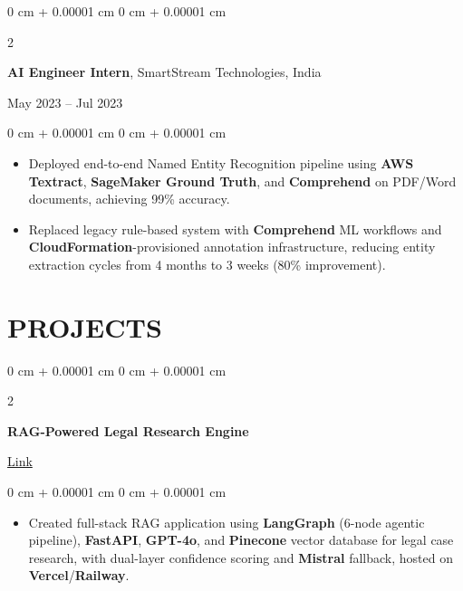 \documentclass[9pt, letterpaper]{extarticle}
\newenvironment{highlights}{
    \linespread{1.05}\selectfont
    \begin{itemize}[
        topsep=0.02 cm,
        parsep=0.02 cm,
        partopsep=0pt,
        itemsep=0.5pt,
        leftmargin=0.5em + 10pt
    ]
}{
    \end{itemize}
} %
\newenvironment{onecolentry}{
    \begin{adjustwidth}{
        0 cm + 0.00001 cm
    }{
        0 cm + 0.00001 cm
    }
}{
    \end{adjustwidth}
} %
\newenvironment{twocolentry}[2][]{
    \onecolentry
    \def\secondColumn{#2}
    \setcolumnwidth{\fill, 4.5 cm}
    \begin{paracol}{2}
}{
    \switchcolumn \raggedleft \secondColumn
    \end{paracol}
    \endonecolentry
} %
\let\hrefWithoutArrow\href
\begin{document}
        \vspace{0.13 cm}

        \begin{twocolentry}{
            May 2023 – Jul 2023
        }
            \textbf{AI Engineer Intern}, SmartStream Technologies, India
        \end{twocolentry}

        \vspace{0.04 cm}
        \begin{onecolentry}
            \begin{highlights}
                \item Deployed end-to-end Named Entity Recognition pipeline using \textbf{AWS Textract}, \textbf{SageMaker Ground Truth}, and \textbf{Comprehend} on PDF/Word documents, achieving 99\% accuracy.
                \item Replaced legacy rule-based system with \textbf{Comprehend} ML workflows and \textbf{CloudFormation}-provisioned annotation infrastructure, reducing entity extraction cycles from 4 months to 3 weeks (80\% improvement).
            \end{highlights}
        \end{onecolentry}


    \section{PROJECTS}

        \begin{twocolentry}{
            \hrefWithoutArrow{https://legal-ai-hazel-xi.vercel.app/}{Link}
        }
            \textbf{RAG-Powered Legal Research Engine}
        \end{twocolentry}

        \vspace{0.04 cm}
        \begin{onecolentry}
            \begin{highlights}
                \item Created full-stack RAG application using \textbf{LangGraph} (6-node agentic pipeline), \textbf{FastAPI}, \textbf{GPT-4o}, and \textbf{Pinecone} vector database for legal case research, with dual-layer confidence scoring and \textbf{Mistral} fallback, hosted on \textbf{Vercel}/\textbf{Railway}.
            \end{highlights}
        \end{onecolentry}

        \vspace{0.13 cm}
\end{document}
